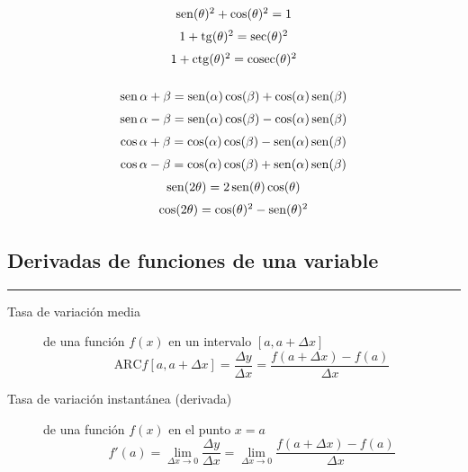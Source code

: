 \begin{multicols}{2}
\begin{tcolorbox}[hbox, title=Identidades pitagóricas]
\begin{minipage}{0.4\textwidth}
\[
\renewcommand{\arraystretch}{1.5}
\begin{array}{c}
\sen(\theta)^2 + \cos(\theta)^2 = 1 \\
1+\tg(\theta)^2 = \sec(\theta)^2    \\
1+\ctg(\theta)^2 = \cosec(\theta)^2
\end{array}
\]
\end{minipage}
\end{tcolorbox}

\begin{tcolorbox}[hbox, title=Razones trigonométicas de sumas de ángulos]
\begin{minipage}{0.4\textwidth}
\[
\renewcommand{\arraystretch}{1.5}
\begin{array}{c}
\sen{\alpha+\beta}=\sen(\alpha)\cos(\beta)+\cos(\alpha)\sen(\beta) \\
\sen{\alpha-\beta}=\sen(\alpha)\cos(\beta)-\cos(\alpha)\sen(\beta) \\
\cos{\alpha+\beta}=\cos(\alpha)\cos(\beta)-\sen(\alpha)\sen(\beta) \\
\cos{\alpha-\beta}=\cos(\alpha)\cos(\beta)+\sen(\alpha)\sen(\beta)\\
\sen(2\theta)=2\sen(\theta)\cos(\theta)\\
\cos(2\theta)=\cos(\theta)^2-\sen(\theta)^2
\end{array}
\]
\end{minipage}
\end{tcolorbox}


\subsection*{Derivadas de funciones de una variable}

\begin{tcolorbox}[hbox, title=Concepto de derivada]
\begin{minipage}{0.4\textwidth}
\flushleft
\rule{0.4\textwidth}{0pt}
\begin{description}
\item[Tasa de variación media] de una función $f(x)$ en un intervalo $[a,a+\Delta x]$
      \[
      \mbox{ARC}f[a,a+\Delta x] = \frac{\Delta y}{\Delta x} = \frac{f(a+\Delta x)-f(a)}{\Delta x}
      \]
\item[Tasa de variación instantánea (derivada)] de una función $f(x)$ en el punto $x=a$
      \[
      f'(a)=\lim_{\Delta x\rightarrow 0} \frac{\Delta y}{\Delta x} = \lim_{\Delta x\rightarrow 0}\frac{f(a+\Delta x)-f(a)}{\Delta x}
      \]
\end{description}
\end{minipage}
\end{tcolorbox}


\end{multicols}
